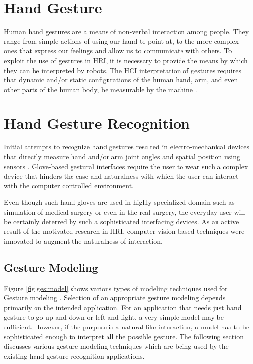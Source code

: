 \section{Hand Gesture} Human hand gestures are a means of non-verbal interaction among people. They range from simple actions of using our hand to point at, to the more complex ones that express our feelings and allow us to communicate with others. To exploit the use of gestures in HRI, it is necessary to provide the means by which they can be interpreted by robots. The HCI interpretation of gestures requires that dynamic and/or static configurations of the human hand, arm, and even other parts of the human body, be measurable by the machine \cite{6}. 

\section{Hand Gesture Recognition} Initial attempts to recognize hand gestures resulted in electro-mechanical devices that directly measure hand and/or arm joint angles and spatial position using sensors \cite{3}. Glove-based gestural interfaces require the user to wear such a complex device that hinders the ease and naturalness with which the user can interact with the computer controlled environment. 

Even though such hand gloves are used in highly specialized domain such as simulation of medical surgery or even in the real surgery, the everyday user will be certainly deterred by such a sophisticated interfacing devices. As an active result of the motivated research in HRI, computer vision based techniques were innovated to augment the naturalness of interaction.

\subsection{Gesture Modeling} Figure \ref{fig:ges:model} shows various types of modeling techniques used for Gesture modeling \cite{3}. Selection of an appropriate gesture modeling depends primarily on the intended application. For an application that needs just hand gesture to go up and down or left and light, a very simple model may be sufficient. However, if the purpose is a natural-like interaction, a model has to be sophisticated enough to interpret all the possible gesture. The following section discusses various gesture modeling techniques which are being used by the existing hand gesture recognition applications. 

